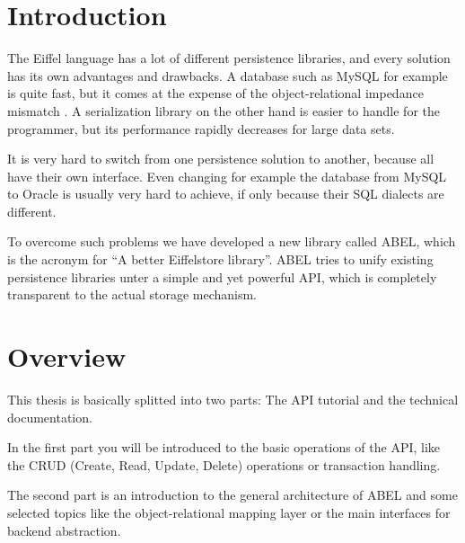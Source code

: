 \section{Introduction}

The Eiffel language \cite{EcmaEiffel} \cite{Meyer09} has a lot of different persistence libraries, and every solution has its own advantages and drawbacks.
A database such as MySQL \cite {MySQL} for example is quite fast, but it comes at the expense of the object-relational impedance mismatch \cite{ORImpedance}.
A serialization library on the other hand is easier to handle for the programmer, but its performance rapidly decreases for large data sets.

It is very hard to switch from one persistence solution to another, because all have their own interface.
Even changing for example the data\-base from MySQL to Oracle \cite{Oracle} is usually very hard to achieve, if only because their SQL dialects are different.

To overcome such problems we have developed a new library called ABEL, which is the acronym for ``A better Eiffelstore library''.
ABEL tries to unify existing persistence libraries unter a simple and yet powerful API, which is completely transparent to the actual storage mechanism.


\section{Overview}
This thesis is basically splitted into two parts: The API tutorial and the technical documentation.

In the first part you will be introduced to the basic operations of the API, like the CRUD (Create, Read, Update, Delete) operations or transaction handling.

The second part is an introduction to the general architecture of ABEL and some selected topics like the object-relational mapping layer or the main interfaces for backend abstraction.